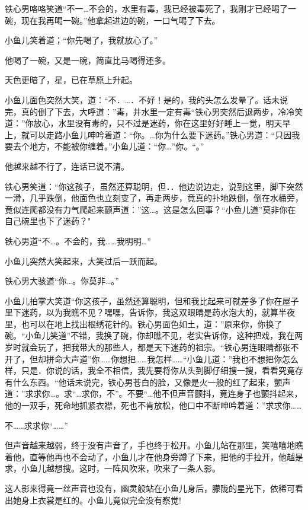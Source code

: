 \documentclass[12pt,oneside]{book}
\begin{document}
铁心男咯咯笑道``不一\ldots 不会的，水里有毒，我已经被毒死了，我刚才已经喝了一碗，现在我再喝一碗。''他拿起进边的碗，一口气喝了下去。

小鱼儿笑着道；``你先喝了，我就放心了。''

他喝了一碗，又是一碗，简直比马喝得还多。

天色更暗了，星，已在草原上升起。

小鱼儿面色突然大笑，道：``不．\ldots．不好！是的，我的头怎么发晕了。话未说完，真的倒了下去，大呼道：''毒，井水里一定有毒``铁心男突然后退两步，冷冷笑道：''你放心，水里没有毒的，只不过是迷药，你在这里好好睡上一觉，明天早上，就可以走路小鱼儿呻吟着道：``你。\ldots 你为什么要下迷药。''铁心男道：``只因我要去个地方，不能被你缠着。''小鱼儿道：``你\ldots{}''你。``。''

他越来越不行了，连话已说不清。

铁心男笑道：``你这孩子，虽然还算聪明，但．．他边说边走，说到这里，脚下突然一滑，几乎跌倒，他面色也立刻变了，再走两步，竟真的扑地跌倒，倒在水桶旁，竟似连爬都没有力气爬起来颤声道：''这\ldots。这是怎么回事？``小鱼儿道''莫非你在自己碗里也下了迷药？"

铁心男道``不\ldots。不会的，我\ldots\ldots 我明明\ldots{}''

小鱼儿突然大笑起来，大笑过后一跃而起。

铁心男大骇道``你\ldots。你莫非\ldots。''

小鱼儿拍掌大笑道``你这孩子，虽然还算聪明，但和我比起来可就差多了你在屋子里下迷药，以为我瞧不见？嘿嘿，告诉你，我这双眼睛是药水泡大的，就算半夜里，也可以在地上找出根绣花针的。铁心男面色如土，道：''原来你，你换了碗。``小鱼儿笑道''不错，我换了碗，你却瞧不见，老实告诉你，这种把戏，我在两岁时就会玩了，把我带大的那些人，都是天下迷药的祖宗。``铁心男连眼睛都张不开了，但却拼命大声道''你\ldots\ldots 你想把\ldots\ldots 我怎样\ldots\ldots{}``小鱼儿道：''我也不想把你怎么样，只是．你说的话，我全不相信，我先要将你从头到脚仔细搜一搜，看看究竟存有什么东西。``他话未说完，铁心男苍白的脸，又像是火一般的红了起来，颤声道：''求求你\ldots。求``\ldots 求你，不''。不要``\ldots 他不但声音颤抖，竟连身子也颤抖起来，他的一双手，死命地抓紧衣襟，死也不肯放松，他口中不断呻吟着道：''求求你\ldots\ldots{}

不\ldots\ldots 求求你``\ldots\ldots{}''

但声音越来越弱，终于没有声音了，手也终于松开。小鱼儿站在那里，笑嘻嘻地瞧着他，直等他再也不会动了，小鱼儿才在他身旁蹲了下来，把他的手拉开，他越是求，小鱼儿越想搜。这时，一阵风吹来，吹来了一条人影。

这人影来得竟一丝声音也没有，幽灵般站在小鱼儿身后，朦陇的星光下，依稀可看出她身上衣裳是红的。小鱼儿竟似完全没有察觉!
\end{document}
